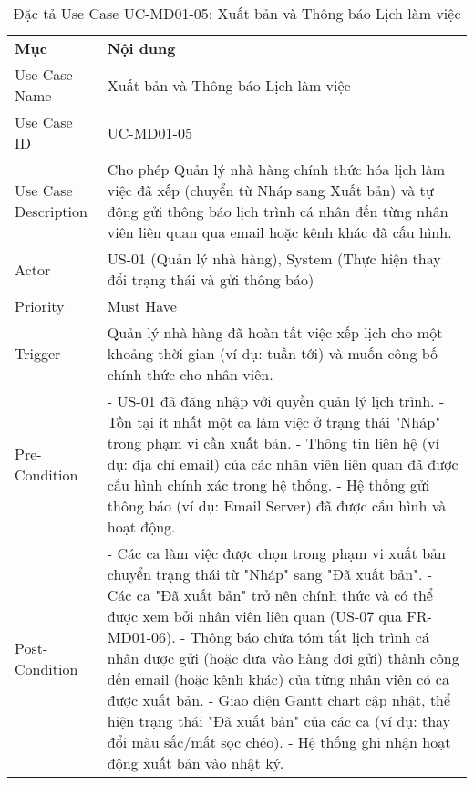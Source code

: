 \begin{longtable}{|m{4cm}|p{11cm}|}
\caption{Đặc tả Use Case UC-MD01-05: Xuất bản và Thông báo Lịch làm việc} \label{tab:uc_md01_05} \\
\hline

\endhead %

\hline
\endfoot %

\hline
\endlastfoot %
\multicolumn{2}{|c|}{\textbf{2.1. Tóm tắt (Summary)}} \\
\hline
\textbf{Mục} & \textbf{Nội dung} \\
\hline
Use Case Name & Xuất bản và Thông báo Lịch làm việc \\
\hline
Use Case ID & UC-MD01-05 \\
\hline
Use Case Description & Cho phép Quản lý nhà hàng chính thức hóa lịch làm việc đã xếp (chuyển từ Nháp sang Xuất bản) và tự động gửi thông báo lịch trình cá nhân đến từng nhân viên liên quan qua email hoặc kênh khác đã cấu hình. \\
\hline
Actor & US-01 (Quản lý nhà hàng), System (Thực hiện thay đổi trạng thái và gửi thông báo) \\
\hline
Priority & Must Have \\
\hline
Trigger & Quản lý nhà hàng đã hoàn tất việc xếp lịch cho một khoảng thời gian (ví dụ: tuần tới) và muốn công bố chính thức cho nhân viên. \\
\hline
Pre-Condition & - US-01 đã đăng nhập với quyền quản lý lịch trình. \newline - Tồn tại ít nhất một ca làm việc ở trạng thái "Nháp" trong phạm vi cần xuất bản. \newline - Thông tin liên hệ (ví dụ: địa chỉ email) của các nhân viên liên quan đã được cấu hình chính xác trong hệ thống. \newline - Hệ thống gửi thông báo (ví dụ: Email Server) đã được cấu hình và hoạt động. \\
\hline
Post-Condition & - Các ca làm việc được chọn trong phạm vi xuất bản chuyển trạng thái từ "Nháp" sang "Đã xuất bản". \newline - Các ca "Đã xuất bản" trở nên chính thức và có thể được xem bởi nhân viên liên quan (US-07 qua FR-MD01-06). \newline - Thông báo chứa tóm tắt lịch trình cá nhân được gửi (hoặc đưa vào hàng đợi gửi) thành công đến email (hoặc kênh khác) của từng nhân viên có ca được xuất bản. \newline - Giao diện Gantt chart cập nhật, thể hiện trạng thái "Đã xuất bản" của các ca (ví dụ: thay đổi màu sắc/mất sọc chéo). \newline - Hệ thống ghi nhận hoạt động xuất bản vào nhật ký. \\

\end{longtable}
